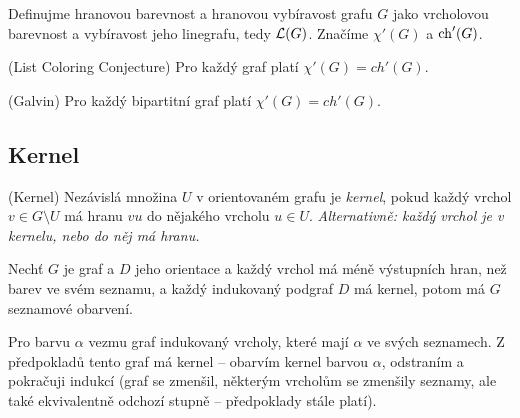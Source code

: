 \df Definujme hranovou barevnost a hranovou vybíravost grafu $G$ jako vrcholovou
barevnost a vybíravost jeho linegrafu, tedy $\mathcal{L}(G)$. Značíme $\chi'(G)$ a
$\operatorname{ch}'(G)$.

\vt (List Coloring Conjecture) Pro každý graf platí $\chi'(G) = ch'(G)$.

\vt (Galvin) Pro každý bipartitní graf platí $\chi'(G) = ch'(G)$.

\subsection{Kernel}

\df (Kernel) Nezávislá množina $U$ v orientovaném grafu je {\it kernel}, pokud
každý vrchol $v\in G \setminus U$ má hranu $vu$ do nějakého vrcholu $u\in U$.
{\it Alternativně: každý vrchol je v kernelu, nebo do něj má hranu.}

\lm Nechť $G$ je graf a $D$ jeho orientace a každý vrchol má méně výstupních
hran, než barev ve svém seznamu, a každý indukovaný podgraf $D$ má kernel, potom
má $G$ seznamové obarvení.

\dk Pro barvu $\alpha$ vezmu graf indukovaný vrcholy, které mají $\alpha$ ve
svých seznamech. Z předpokladů tento graf má kernel -- obarvím kernel barvou
$\alpha$, odstraním a pokračuji indukcí (graf se zmenšil, některým vrcholům se
zmenšily seznamy, ale také ekvivalentně odchozí stupně -- předpoklady stále
platí).
